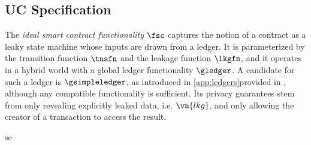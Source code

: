 \subsection{UC Specification}
\label{sec:fsc}

The \emph{ideal smart contract functionality} $\fsc$ captures the
notion of a contract as a leaky state machine whose inputs are drawn
from a ledger. It is parameterized by the transition function $\tnsfn$
and the leakage function $\lkgfn$, and it operates in a hybrid world with a
global ledger functionality $\gledger$. A candidate for such a ledger is
$\gsimpleledger$, as \iffull introduced in
\autoref{app:ledgers}\else provided in \cite[Appendix~B]{fullversion}\fi, although any
compatible functionality is sufficient. Its privacy guarantees stem from
only revealing explicitly leaked data, i.e. $\vn{lkg}$, and only allowing the
creator of a transaction to access the result.

{sc}

